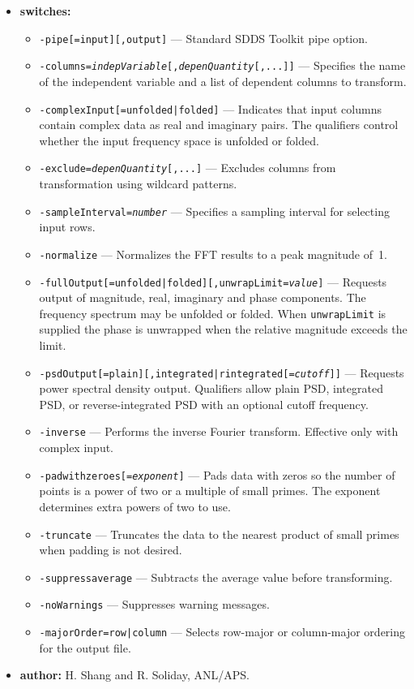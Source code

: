 \begin{itemize}
\item {\bf switches:}
    \begin{itemize}
    \item {\tt -pipe[=input][,output]} --- Standard SDDS Toolkit pipe option.
    \item {\tt -columns={\em indepVariable}[,{\em depenQuantity}[,...]]} --- Specifies the name of the independent variable and a list of dependent columns to transform.
    \item {\tt -complexInput[=unfolded|folded]} --- Indicates that input columns contain complex data as real and imaginary pairs. The qualifiers control whether the input frequency space is unfolded or folded.
    \item {\tt -exclude={\em depenQuantity}[,...]} --- Excludes columns from transformation using wildcard patterns.
    \item {\tt -sampleInterval={\em number}} --- Specifies a sampling interval for selecting input rows.
    \item {\tt -normalize} --- Normalizes the FFT results to a peak magnitude of~1.
    \item {\tt -fullOutput[=unfolded|folded][,unwrapLimit={\em value}]} --- Requests output of magnitude, real, imaginary and phase components. The frequency spectrum may be unfolded or folded. When {\tt unwrapLimit} is supplied the phase is unwrapped when the relative magnitude exceeds the limit.
    \item {\tt -psdOutput[=plain][,{integrated|rintegrated[={\em cutoff}]}]} --- Requests power spectral density output. Qualifiers allow plain PSD, integrated PSD, or reverse-integrated PSD with an optional cutoff frequency.
    \item {\tt -inverse} --- Performs the inverse Fourier transform. Effective only with complex input.
    \item {\tt -padwithzeroes[={\em exponent}]} --- Pads data with zeros so the number of points is a power of two or a multiple of small primes. The exponent determines extra powers of two to use.
    \item {\tt -truncate} --- Truncates the data to the nearest product of small primes when padding is not desired.
    \item {\tt -suppressaverage} --- Subtracts the average value before transforming.
    \item {\tt -noWarnings} --- Suppresses warning messages.
    \item {\tt -majorOrder=row|column} --- Selects row-major or column-major ordering for the output file.
    \end{itemize}
\item {\bf author:} H. Shang and R. Soliday, ANL/APS.
\end{itemize}
